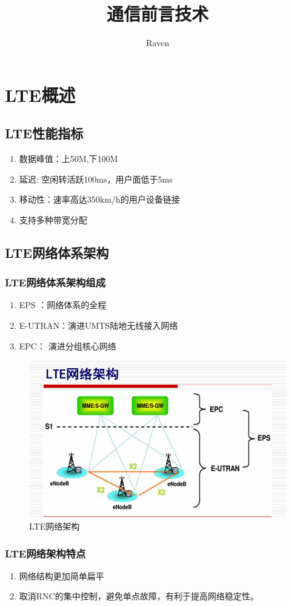\documentclass{report}
\begin{document}
	\title{通信前言技术}
	\author{Raven}
	\date{}
	\maketitle
	\tableofcontents	
	\chapter{LTE概述}
	\section{LTE性能指标}
	\begin{enumerate}
		\item 数据峰值：上50M,下100M
		\item 延迟: 空闲转活跃100ms，用户面低于5ms
		\item 移动性：速率高达350km/h的用户设备链接
		\item 支持多种带宽分配
	\end{enumerate}
	\section{LTE网络体系架构}
	\subsection{LTE网络体系架构组成}
	\begin{enumerate}
		\item EPS ：网络体系的全程
		\item E-UTRAN：演进UMTS陆地无线接入网络
		\item EPC： 演进分组核心网络
	\end{enumerate}
	\begin{figure}[H]
		\centering
		\includegraphics[width=0.7\linewidth]{LTE网络架构}
		\caption{LTE网络架构}
		\label{fig:lte}
	\end{figure}
	\subsection{LTE网络架构特点}
	\begin{enumerate}
		\item 网络结构更加简单扁平
		\item 取消RNC的集中控制，避免单点故障，有利于提高网络稳定性。
	\end{enumerate}
\end{document}
